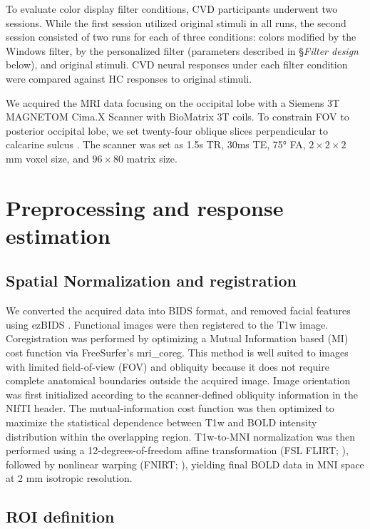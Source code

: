 To evaluate color display filter conditions, CVD participants underwent two sessions. While the first session utilized original stimuli in all runs, the second session consisted of two runs for each of three conditions: colors modified by the Windows filter, by the personalized filter (parameters described in §\textit{Filter design} below), and original stimuli. CVD neural responses under each filter condition were compared against HC responses to original stimuli.

We acquired the MRI data focusing on the occipital lobe with a Siemens 3T MAGNETOM Cima.X Scanner with BioMatrix 3T coils. To constrain FOV to posterior occipital lobe, we set twenty-four oblique slices perpendicular to calcarine sulcus \cite{ryu2024}. The scanner was set as 1.5s TR, 30ms TE, 75° FA, $2 \times 2 \times 2$ mm voxel size, and $96 \times 80$ matrix size.

\section{Preprocessing and response estimation}

\subsection*{Spatial Normalization and registration}

We converted the acquired data into BIDS format, and removed facial features using ezBIDS \cite{levitas2024}. Functional images were then registered to the T1w image. Coregistration was performed by optimizing a Mutual Information based (MI) cost function \cite{maes1997, wells1996} via FreeSurfer's mri\_coreg. This method is well suited to images with limited field-of-view (FOV) and obliquity because it does not require complete anatomical boundaries outside the acquired image. Image orientation was first initialized according to the scanner-defined obliquity information in the NIfTI header. The mutual-information cost function was then optimized to maximize the statistical dependence between T1w and BOLD intensity distribution within the overlapping region. T1w-to-MNI normalization was then performed using a 12-degrees-of-freedom affine transformation (FSL FLIRT; ), followed by nonlinear warping (FNIRT; ), yielding final BOLD data in MNI space at 2 mm isotropic resolution.

\subsection*{ROI definition}

